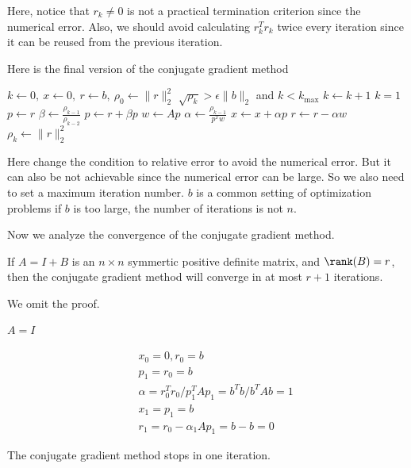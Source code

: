 Here, notice that $r_k \neq 0$ is not a practical termination criterion since the numerical error. Also, we should avoid calculating $r_k^T r_k$ twice every iteration since it can be reused from the previous iteration.

\newpage

Here is the final version of the conjugate gradient method
\begin{codebox}
\li $k \gets 0,\ x \gets 0,\ r \gets b,\ \rho_0 \gets \|r\|_2^2$
\li \While $\sqrt{\rho_k} > \epsilon\|b\|_2$ and $k < k_{\max}$ \Do
\li    $k \gets k + 1$
\li    \If $k = 1$ \Then
\li        $p \gets r$
\li    \Else
\li        $\beta \gets \frac{\rho_{k-1}}{\rho_{k-2}}$
\li        $p \gets r + \beta p$
\End
\li    $w \gets A p$
\li    $\alpha \gets \frac{\rho_{k-1}}{p^T w}$
\li    $x \gets x + \alpha p$
\li    $r \gets r - \alpha w$
\li    $\rho_k \gets \|r\|_2^2$
\End
\end{codebox}

\begin{note}
    Here change the condition to relative error to avoid the numerical error. But it can also be not achievable since the numerical error can be large. So we also need to set a maximum iteration number. $b$ is a common setting of optimization problems if $b$ is too large, the number of iterations is not $n$.
\end{note}

Now we analyze the convergence of the conjugate gradient method. 

\begin{theorem}
    If $A = I + B$ is an $n \times n$ symmertic positive definite matrix, and $\rank(B) = r$, then the conjugate gradient method will converge in at most $r + 1$ iterations.
\end{theorem}

We omit the proof.

\begin{eg}
    $A = I$
\end{eg}
\begin{eqnarray*}
&& x_0 = 0, r_0 = b \\
&& p_1 = r_0 = b \\
&& \alpha = r_0^Tr_0/p_1^TAp_1 
= b^Tb/b^TAb = 1\\
&& x_1 = p_1 = b \\
&& r_1 = r_0 - \alpha_1 Ap_1 = b - b = 0    
\end{eqnarray*}

The conjugate gradient method stops in one iteration.

